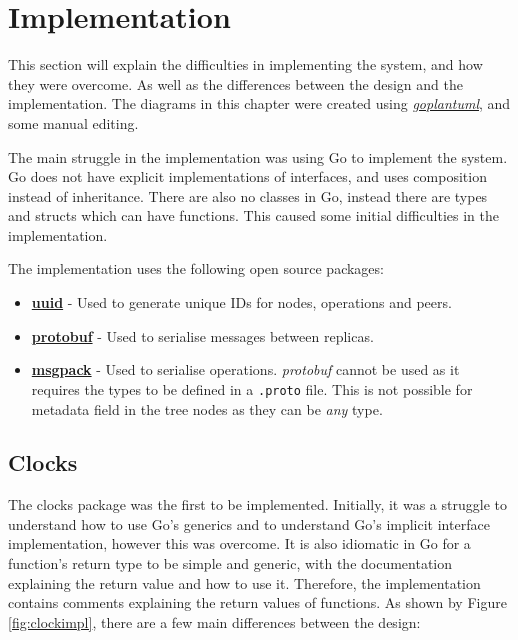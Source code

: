 \documentclass[12pt]{report}
\begin{document}
\chapter{Implementation}\label{sec:implementation}
This section will explain the difficulties in implementing the system, and how they were overcome. As well as the differences between the design and the implementation. The diagrams in this chapter were created using \href{https://github.com/jfeliu007/goplantuml}{\color{blue}\textit{goplantuml}}, and some manual editing.  \par
The main struggle in the implementation was using Go to implement the system. Go does not have explicit implementations of interfaces, and uses composition instead of inheritance. There are also no classes in Go, instead there are types and structs which can have functions. This caused some initial difficulties in the implementation. \par

The implementation uses the following open source packages:
\begin{itemize}
    \item \textbf{\href{https://pkg.go.dev/github.com/google/uuid@v1.3.0}{uuid}} - Used to generate unique IDs for nodes, operations and peers.
    \item \textbf{\href{https://pkg.go.dev/google.golang.org/protobuf}{protobuf}} - Used to serialise messages between replicas.
    \item \textbf{\href{https://pkg.go.dev/github.com/vmihailenco/msgpack@v4.0.4+incompatible}{msgpack}} - Used to serialise operations. \textit{protobuf} cannot be used as it requires the types to be defined in a \texttt{.proto} file. This is not possible for metadata field in the tree nodes as they can be \textit{any} type.
\end{itemize}

\section{Clocks}
The clocks package was the first to be implemented. Initially, it was a struggle to understand how to use Go's generics and to understand Go's implicit interface implementation, however this was overcome. It is also idiomatic in Go for a function's return type to be simple and generic, with the documentation explaining the return value and how to use it. Therefore, the implementation contains comments explaining the return values of functions. As shown by Figure \ref{fig:clockimpl}, there are a few main differences between the design:
\end{document}
